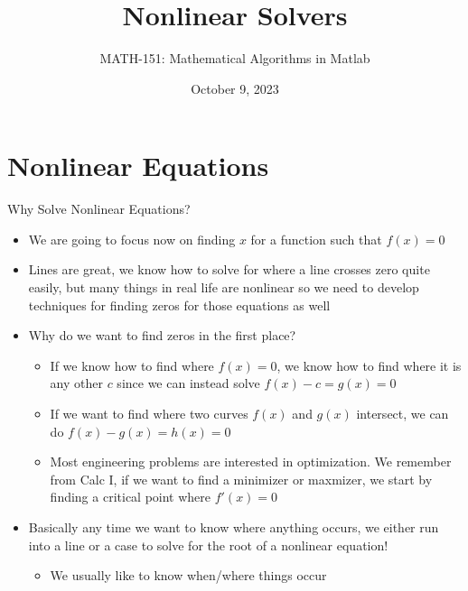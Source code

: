 {}\documentclass[letterpaper,
compress,
xcolor=x11names,
]{beamer}
\begin{document}
	\title{Nonlinear Solvers}
	\author{MATH-151:  Mathematical Algorithms in Matlab}
	\date[202X]{October 9, 2023}




\begin{frame}
\titlepage
\end{frame}
\section{Nonlinear Equations}

\begin{frame}{Why Solve Nonlinear Equations?}
	\footnotesize
	\begin{itemize}
		\item We are going to focus now on finding $x$ for a function such that $f(x) = 0$
		\item Lines are great, we know how to solve for where a line crosses zero quite easily, but many things in real life are nonlinear so we need to develop techniques for finding zeros for those equations as well
		\item Why do we want to find zeros in the first place?
		\begin{itemize}
			\item If we know how to find where $f(x)=0$, we know how to find where it is any other $c$ since we can instead solve $f(x) - c = g(x) = 0$
			\item If we want to find where two curves $f(x)$ and $g(x)$ intersect, we can do $f(x) - g(x) = h(x) = 0$
			\item Most engineering problems are interested in optimization. We remember from Calc I, if we want to find a minimizer or maxmizer, we start by finding a critical point where $f'(x) = 0$
		\end{itemize}
		\item Basically any time we want to know where anything occurs, we either run into a line or a case to solve for the root of a nonlinear equation!
		\begin{itemize}
			\item We usually like to know when/where things occur
		\end{itemize}
	\end{itemize}
\end{frame}
\end{document}
